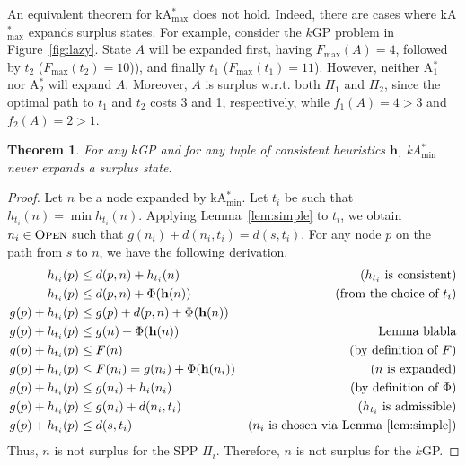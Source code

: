 \documentclass[twoside,11pt]{article}
\newtheorem{theorem}{Theorem}
\newcommand{\kgs}{$k$GP\xspace}
\newcommand{\kastarvar}[1]{\textup{kA}$^*_{#1}$\xspace}
\newcommand{\kastarmin}{\kastarvar{\min}}
\newcommand{\kastarmax}{\kastarvar{\max}}
\newcommand{\astari}[1]{A$^*_{#1}$\xspace}
\newcommand{\open}{\textsc{Open}\xspace}
\newcommand{\vect}[1]{\mathbf{#1}}
\begin{document}
An equivalent theorem for \kastarmax does not hold.
Indeed, there are cases where \kastarmax expands surplus states.
For example, consider the \kgs problem in Figure~\ref{fig:lazy}.
State $A$ will be expanded first, having $F_{\max}(A) = 4$, followed by $t_2$ ($F_{\max}(t_2) = 10$)), and finally $t_1$ ($F_{\max}(t_1) = 11$).
However, neither \astari{1} nor \astari{2} will expand $A$.
Moreover, $A$ is surplus w.r.t. both $\Pi_1$ and $\Pi_2$, since the optimal path to $t_1$ and $t_2$ costs 3 and 1, respectively, while $f_1(A) = 4 > 3$ and $f_2(A) = 2 > 1$.



\begin{theorem}
	\label{the:kastarmin-surplus}
	For any \kgs and for any tuple of consistent heuristics $\vect{h}$, \kastarmin never expands a surplus state.
\end{theorem}
\begin{proof}
	Let $n$ be a node expanded by \kastarmin.
	Let $t_i$ be such that $h_{t_i}(n) = \min h_{t_i}(n)$.
	Applying Lemma~\ref{lem:simple} to $t_i$, we obtain $n_i \in \open$ such that $g(n_i) + d(n_i, t_i) = d(s, t_i)$.
	For any node $p$ on the path from $s$ to $n$, we have the following derivation.
	\begin{align}
	h_{t_i}(p)        & \leq d(p, n) + h_{t_i}(n)         & \text{($h_{t_i}$ is consistent)}\\
	h_{t_i}(p)        & \leq d(p, n) + \Phi(\vect{h}(n))         & \text{(from the choice of $t_i$)}\\
	g(p) + h_{t_i}(p) & \leq g(p) + d(p, n) + \Phi(\vect{h}(n)) & \text{}\\
	g(p) + h_{t_i}(p) & \leq g(n) + \Phi(\vect{h}(n))          & \text{Lemma blabla}\\
	g(p) + h_{t_i}(p) & \leq F(n)         & \text{(by definition of $F$)}\\
	g(p) + h_{t_i}(p) & \leq F(n_i) = g(n_i) + \Phi(\vect{h}(n_i))      & \text{($n$ is expanded)}\\
	g(p) + h_{t_i}(p) & \leq g(n_i) + h_i(n_i) & \text{(by definition of $\Phi$)}\\
	g(p) + h_{t_i}(p) & \leq g(n_i) + d(n_i, t_i) & \text{($h_{t_i}$ is admissible)}\\
	g(p) + h_{t_i}(p) & \leq d(s, t_i) & \text{($n_i$ is chosen via Lemma~\ref{lem:simple})}
	\label{eq:nosurplus}
	\end{align}
	Thus, $n$ is not surplus for the SPP $\Pi_i$.
	Therefore, $n$ is not surplus for the \kgs.
\end{proof}
\end{document}
